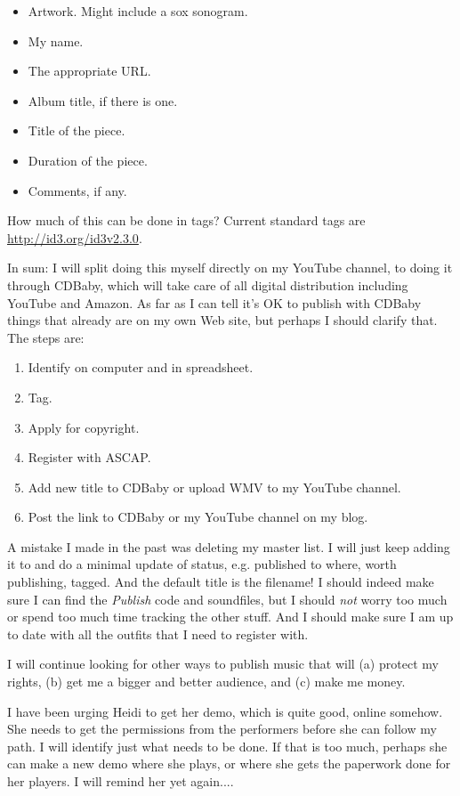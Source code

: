 \documentclass[english,11pt,letterpaper,onecolumn]{scrartcl}
\begin{document}
\begin{enumerate}
\begin{itemize}
\item Artwork. Might include a sox sonogram.
\item My name.
\item The appropriate URL.
\item Album title, if there is one.
\item Title of the piece.
\item Duration of the piece.
\item Comments, if any.
\end{itemize}
\noindent How much of this can be done in tags? Current standard tags are \url{http://id3.org/id3v2.3.0}.
\end{enumerate}

\noindent In sum: I will split doing this myself directly on my YouTube channel, to doing it through CDBaby, which will take care of all digital distribution including YouTube and Amazon. As far as I can tell it's OK to publish with CDBaby things that already are on my own Web site, but perhaps I should clarify that. The steps are:

\begin{enumerate}
\item Identify on computer and in spreadsheet.
\item Tag. 
\item Apply for copyright. 
\item Register with ASCAP.
\item Add new title to CDBaby or upload WMV to my YouTube channel.
\item Post the link to CDBaby or my YouTube channel on my blog.
\end{enumerate}

A mistake I made in the past was deleting my master list. I will just keep adding it to and do a minimal update of status, e.g. published to where, worth publishing, tagged. And the default title is the filename! I should indeed make sure I can find the \emph{Publish} code and soundfiles, but I should \emph{not} worry too much or spend too much time tracking the other stuff. And I should make sure I am up to date with all the outfits that I need to register with.

I will continue looking for other ways to publish music that will (a) protect my rights, (b) get me a bigger and better audience, and (c) make me money.

I have been urging Heidi to get her demo, which is quite good, online somehow. She needs to get the permissions from the performers before she can follow my path. I will identify just what needs to be done. If that is too much, perhaps she can make a new demo where she plays, or where she gets the paperwork done for her players. I will remind her yet again....
\end{document}
